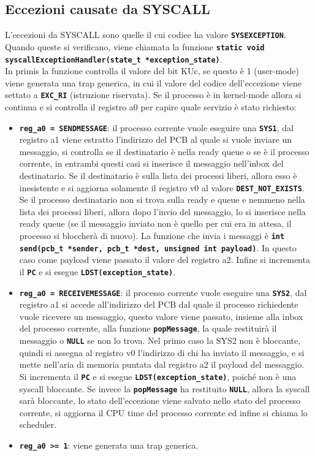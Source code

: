 \documentclass{article}
\begin{document}
\subsection{Eccezioni causate da SYSCALL}
L'eccezioni da SYSCALL sono quelle il cui codice ha valore \texttt{\textbf{SYSEXCEPTION}}. Quando queste si verificano, viene chiamata la 
funzione \texttt{\textbf{static void syscallExceptionHandler(state\_t *exception\_state)}}. \\In primis la funzione controlla il valore 
del bit KUc, se questo è 1 (user-mode) viene generata una trap generica, in cui il valore del codice dell'eccezione viene settato a 
\texttt{\textbf{EXC\_RI}} (istruzione riservata).
Se il processo è in kernel-mode allora si continua e si controlla il registro a0 per capire quale servizio è stato richiesto:
\begin{itemize}
  \item \texttt{\textbf{reg\_a0 = SENDMESSAGE}}: il processo corrente vuole eseguire una \texttt{\textbf{SYS1}}, dal registro a1 viene 
    estratto l'indirizzo del PCB al quale si vuole inviare un messaggio, si controlla se il destinatario è nella ready queue o se è il 
    processo corrente, in entrambi questi casi si inserisce il messaggio nell'inbox del destinatario. Se il destinatario è sulla lista dei 
    processi liberi, allora esso è inesistente e si aggiorna solamente il registro v0 al valore \texttt{\textbf{DEST\_NOT\_EXISTS}}. 
    Se il processo destinatario non si trova sulla ready e queue e nemmeno nella lista dei processi liberi, allora dopo l'invio del messaggio,    lo si inserisce nella ready queue (se il messaggio inviato non è quello per cui era in attesa, il processo si bloccherà di nuovo).
    La funzione che invia i messaggi è \texttt{\textbf{int send(pcb\_t *sender, pcb\_t *dest, unsigned int payload)}}. In questo caso come 
    payload viene passato il valore del registro a2. Infine si incrementa il \texttt{\textbf{PC}} e si esegue 
    \texttt{\textbf{LDST(exception\_state)}}.
  \item \texttt{\textbf{reg\_a0 = RECEIVEMESSAGE}}: il processo corrente vuole eseguire una \texttt{\textbf{SYS2}}, dal registro a1 si 
    accede all'indirizzo del PCB dal quale il processo richiedente vuole ricevere un messaggio, questo valore viene passato, insieme
    alla inbox del processo corrente, alla funzione \texttt{\textbf{popMessage}}, la quale restituirà il messaggio o \texttt{\textbf{NULL}} 
    se non lo trova. Nel primo caso la SYS2 non è bloccante, quindi si assegna al registro v0 l'indirizzo di chi ha inviato il messaggio, 
    e si mette nell'aria di memoria puntata dal registro a2 il payload del messaggio. Si incrementa il \texttt{\textbf{PC}} e si esegue 
    \texttt{\textbf{LDST(exception\_state)}}, poiché non è una syscall bloccante. Se invece la \texttt{\textbf{popMessage}} ha restituito 
    \texttt{\textbf{NULL}}, allora la syscall sarà bloccante, lo stato dell'eccezione viene salvato nello stato del processo corrente, 
    si aggiorna il CPU time del processo corrente ed infine si chiama lo scheduler. 
  \item \texttt{\textbf{reg\_a0 >= 1}}: viene generata una trap generica.
\end{itemize}
\end{document}
